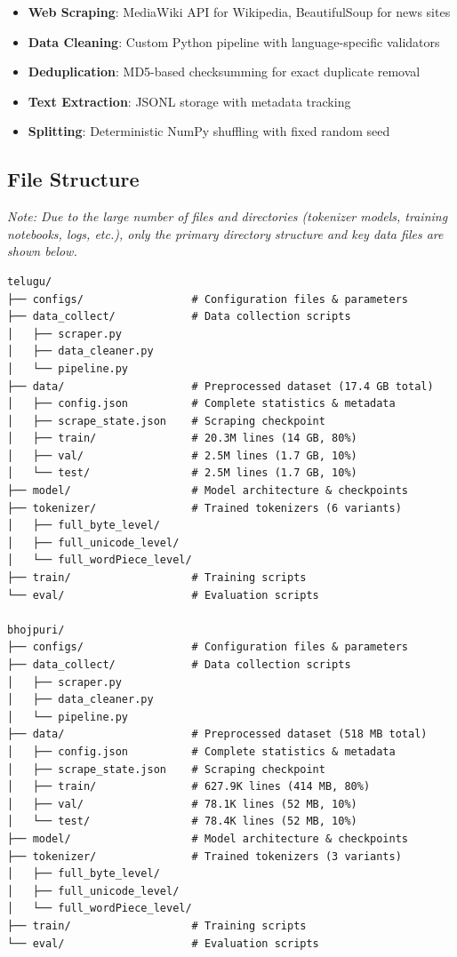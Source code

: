 \documentclass[11pt,a4paper]{article}
\begin{document}
\begin{itemize}
    \item \textbf{Web Scraping}: MediaWiki API for Wikipedia, BeautifulSoup for news sites
    \item \textbf{Data Cleaning}: Custom Python pipeline with language-specific validators
    \item \textbf{Deduplication}: MD5-based checksumming for exact duplicate removal
    \item \textbf{Text Extraction}: JSONL storage with metadata tracking
    \item \textbf{Splitting}: Deterministic NumPy shuffling with fixed random seed
\end{itemize}

\subsection{File Structure}

\textit{Note: Due to the large number of files and directories (tokenizer models, training notebooks, logs, etc.), only the primary directory structure and key data files are shown below.}

\begin{verbatim}
telugu/
├── configs/                 # Configuration files & parameters
├── data_collect/            # Data collection scripts
│   ├── scraper.py
│   ├── data_cleaner.py
│   └── pipeline.py
├── data/                    # Preprocessed dataset (17.4 GB total)
│   ├── config.json          # Complete statistics & metadata
│   ├── scrape_state.json    # Scraping checkpoint
│   ├── train/               # 20.3M lines (14 GB, 80%)
│   ├── val/                 # 2.5M lines (1.7 GB, 10%)
│   └── test/                # 2.5M lines (1.7 GB, 10%)
├── model/                   # Model architecture & checkpoints
├── tokenizer/               # Trained tokenizers (6 variants)
│   ├── full_byte_level/
│   ├── full_unicode_level/
│   └── full_wordPiece_level/
├── train/                   # Training scripts
└── eval/                    # Evaluation scripts

bhojpuri/
├── configs/                 # Configuration files & parameters
├── data_collect/            # Data collection scripts
│   ├── scraper.py
│   ├── data_cleaner.py
│   └── pipeline.py
├── data/                    # Preprocessed dataset (518 MB total)
│   ├── config.json          # Complete statistics & metadata
│   ├── scrape_state.json    # Scraping checkpoint
│   ├── train/               # 627.9K lines (414 MB, 80%)
│   ├── val/                 # 78.1K lines (52 MB, 10%)
│   └── test/                # 78.4K lines (52 MB, 10%)
├── model/                   # Model architecture & checkpoints
├── tokenizer/               # Trained tokenizers (3 variants)
│   ├── full_byte_level/
│   ├── full_unicode_level/
│   └── full_wordPiece_level/
├── train/                   # Training scripts
└── eval/                    # Evaluation scripts
\end{verbatim}
\end{document}
